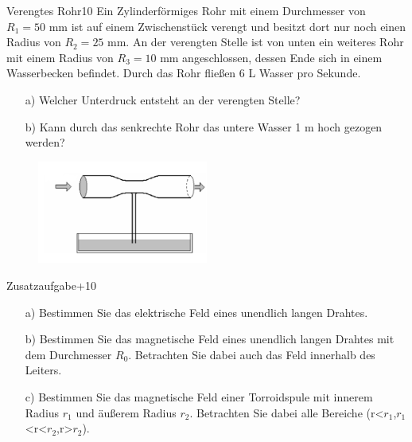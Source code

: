 \begin{exercise}{Verengtes Rohr}{10}
  Ein Zylinderförmiges Rohr mit einem Durchmesser von $R_{1}=50$ mm ist auf
  einem Zwischenstück verengt und besitzt dort nur noch einen Radius von
  $R_{2}=25$ mm. An der verengten Stelle ist von unten ein weiteres Rohr mit
  einem Radius von $R_{3}=10$ mm angeschlossen, dessen Ende sich in einem
  Wasserbecken befindet. Durch das Rohr flie\ss en 6 L Wasser pro Sekunde.

  \begin{enumerate}
    \item [a)] Welcher Unterdruck entsteht an der verengten Stelle?
    \item [b)] Kann durch das senkrechte Rohr das untere Wasser 1 m hoch gezogen
    werden?
  \end{enumerate}
\end{exercise}

\FloatBarrier

  \begin{figure}[h]
    \centering
    \includegraphics[width = 0.5\textwidth]{Rohr.jpg}
  \end{figure}


\begin{exercise}{Zusatzaufgabe}{+10}
  \begin{enumerate}
    \item [a)] Bestimmen Sie das elektrische Feld eines unendlich langen Drahtes.
    \item [b)] Bestimmen Sie das magnetische Feld eines unendlich langen Drahtes
               mit dem Durchmesser $R_{0}$. Betrachten Sie dabei auch das Feld
               innerhalb des Leiters.
    \item [c)] Bestimmen Sie das magnetische Feld einer Torroidspule mit innerem
               Radius $r_{1}$ und äu\ss erem Radius $r_{2}$. Betrachten Sie dabei
               alle Bereiche (r<$r_{1}$,$r_{1}$<r<$r_{2}$,r>$r_{2}$).
  \end{enumerate}
\end{exercise}
